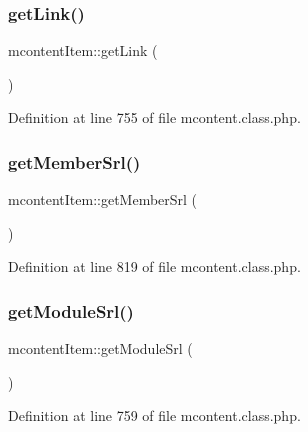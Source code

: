 \subsubsection{\texorpdfstring{get\+Link()}{getLink()}}
{\footnotesize\ttfamily mcontent\+Item\+::get\+Link (\begin{DoxyParamCaption}{ }\end{DoxyParamCaption})}



Definition at line 755 of file mcontent.\+class.\+php.

\hypertarget{classmcontentItem_ab7ad6741a93ab7d631f78bf1253f6800}{}\label{classmcontentItem_ab7ad6741a93ab7d631f78bf1253f6800} 
\subsubsection{\texorpdfstring{get\+Member\+Srl()}{getMemberSrl()}}
{\footnotesize\ttfamily mcontent\+Item\+::get\+Member\+Srl (\begin{DoxyParamCaption}{ }\end{DoxyParamCaption})}



Definition at line 819 of file mcontent.\+class.\+php.

\hypertarget{classmcontentItem_a9b9841e39ff3ee331679270f9e075203}{}\label{classmcontentItem_a9b9841e39ff3ee331679270f9e075203} 
\subsubsection{\texorpdfstring{get\+Module\+Srl()}{getModuleSrl()}}
{\footnotesize\ttfamily mcontent\+Item\+::get\+Module\+Srl (\begin{DoxyParamCaption}{ }\end{DoxyParamCaption})}



Definition at line 759 of file mcontent.\+class.\+php.

\hypertarget{classmcontentItem_a8182db3f99934760d5f52082b233a1cb}{}\label{classmcontentItem_a8182db3f99934760d5f52082b233a1cb} 
